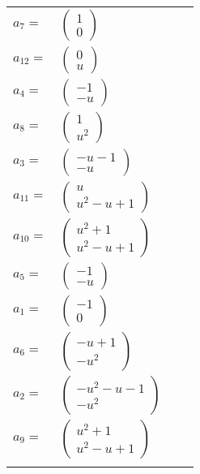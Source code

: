 \documentclass[1p]{elsarticle_modified}
\theoremstyle{definition}
\begin{document}
\begin{tabular}{m{7pt} m{180pt} m{7pt} m{180pt} }
\flushright $a_{7}=$&$\begin{pmatrix}1\\0\end{pmatrix}$ \\
\flushright $a_{12}=$&$\begin{pmatrix}0\\u\end{pmatrix}$ \\
\flushright $a_{4}=$&$\begin{pmatrix}-1\\- u\end{pmatrix}$ \\
\flushright $a_{8}=$&$\begin{pmatrix}1\\u^2\end{pmatrix}$ \\
\flushright $a_{3}=$&$\begin{pmatrix}- u-1\\- u\end{pmatrix}$ \\
\flushright $a_{11}=$&$\begin{pmatrix}u\\u^2- u+1\end{pmatrix}$ \\
\flushright $a_{10}=$&$\begin{pmatrix}u^2+1\\u^2- u+1\end{pmatrix}$ \\
\flushright $a_{5}=$&$\begin{pmatrix}-1\\- u\end{pmatrix}$ \\
\flushright $a_{1}=$&$\begin{pmatrix}-1\\0\end{pmatrix}$ \\
\flushright $a_{6}=$&$\begin{pmatrix}- u+1\\- u^2\end{pmatrix}$ \\
\flushright $a_{2}=$&$\begin{pmatrix}- u^2- u-1\\- u^2\end{pmatrix}$ \\
\flushright $a_{9}=$&$\begin{pmatrix}u^2+1\\u^2- u+1\end{pmatrix}$\\&\end{tabular}
\end{document}
